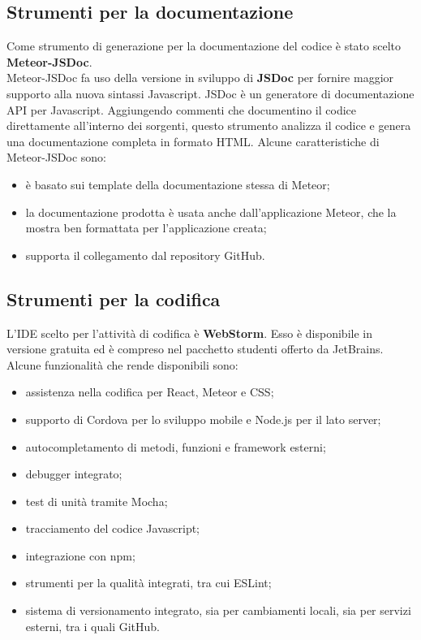 \subsection{Strumenti per la documentazione}
Come strumento di generazione per la documentazione del codice è stato scelto \textbf{Meteor-JSDoc}.\\
Meteor-JSDoc fa uso della versione in sviluppo di \textbf{JSDoc} per fornire maggior supporto alla nuova sintassi Javascript.
JSDoc è un generatore di documentazione API per Javascript. Aggiungendo commenti che documentino il codice direttamente all'interno dei sorgenti, questo strumento analizza il codice e genera una documentazione completa in formato HTML.
Alcune caratteristiche di Meteor-JSDoc sono:
\begin{itemize}
	\item è basato sui template della documentazione stessa di Meteor;
	\item la documentazione prodotta è usata anche dall'applicazione Meteor, che la mostra ben formattata per l'applicazione creata;
	\item supporta il collegamento dal repository GitHub.
\end{itemize}

\subsection{Strumenti per la codifica}
L'IDE scelto per l'attività di codifica è \textbf{WebStorm}. Esso è disponibile in versione gratuita ed è compreso nel pacchetto studenti offerto da JetBrains. Alcune funzionalità che rende disponibili sono:
\begin{itemize}
	\item assistenza nella codifica per React, Meteor e CSS;
	\item supporto di Cordova per lo sviluppo mobile e Node.js per il lato server;
	\item autocompletamento di metodi, funzioni e framework esterni;
	\item debugger integrato;
	\item test di unità tramite Mocha;
	\item tracciamento del codice Javascript;
	\item integrazione con npm;
	\item strumenti per la qualità integrati, tra cui ESLint;
	\item sistema di versionamento integrato, sia per cambiamenti locali, sia per servizi esterni, tra i quali GitHub.
\end{itemize}

